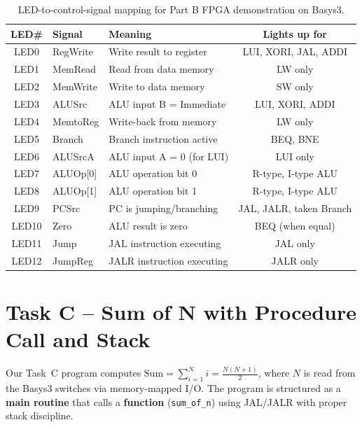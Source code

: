 \documentclass[11pt,a4paper]{article}
\begin{document}
\begin{table}[H]
\centering\small
\begin{tabular}{c|l|l|c}
\toprule
\textbf{LED\#} & \textbf{Signal} & \textbf{Meaning} & \textbf{Lights up for} \\
\midrule
LED0  & RegWrite  & Write result to register   & LUI, XORI, JAL, ADDI \\
LED1  & MemRead   & Read from data memory      & LW only \\
LED2  & MemWrite  & Write to data memory       & SW only \\
LED3  & ALUSrc    & ALU input B = Immediate    & LUI, XORI, ADDI \\
LED4  & MemtoReg  & Write-back from memory     & LW only \\
LED5  & Branch    & Branch instruction active  & BEQ, BNE \\
LED6  & ALUSrcA   & ALU input A = 0 (for LUI)  & LUI only \\
LED7  & ALUOp[0]  & ALU operation bit 0        & R-type, I-type ALU \\
LED8  & ALUOp[1]  & ALU operation bit 1        & R-type, I-type ALU \\
LED9  & PCSrc     & PC is jumping/branching    & JAL, JALR, taken Branch \\
LED10 & Zero      & ALU result is zero         & BEQ (when equal) \\
LED11 & Jump      & JAL instruction executing  & JAL only \\
LED12 & JumpReg   & JALR instruction executing & JALR only \\
\bottomrule
\end{tabular}
\caption{LED-to-control-signal mapping for Part B FPGA demonstration on Basys3.}
\end{table}

\section{Task C -- Sum of N with Procedure Call and Stack}

Our Task~C program computes $\text{Sum} = \sum_{i=1}^{N} i = \frac{N(N+1)}{2}$, where $N$ is read from the Basys3 switches via memory-mapped I/O. The program is structured as a \textbf{main routine} that calls a \textbf{function} (\texttt{sum\_of\_n}) using JAL/JALR with proper stack discipline.
\end{document}
